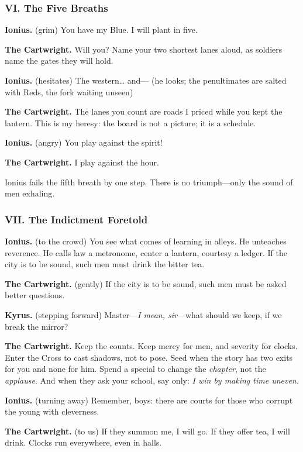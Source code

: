 \documentclass[11pt]{article}
\begin{document}
\medskip
\subsubsection*{VI. The Five Breaths}
\noindent\textbf{Ionius.} (grim) You have my Blue. I will plant in five.

\noindent\textbf{The Cartwright.} Will you? Name your two shortest lanes aloud, as soldiers name the gates they will hold.

\noindent\textbf{Ionius.} (hesitates) The western… and— (he looks; the penultimates are salted with Reds, the fork waiting unseen)

\noindent\textbf{The Cartwright.} The lanes you count are roads I priced while you kept the lantern. This is my heresy: the board is not a picture; it is a schedule.

\noindent\textbf{Ionius.} (angry) You play against the spirit!

\noindent\textbf{The Cartwright.} I play against the hour.

Ionius fails the fifth breath by one step. There is no triumph—only the sound of men exhaling.

\medskip
\subsubsection*{VII. The Indictment Foretold}
\noindent\textbf{Ionius.} (to the crowd) You see what comes of learning in alleys. He unteaches reverence. He calls law a metronome, center a lantern, courtesy a ledger. If the city is to be sound, such men must drink the bitter tea.

\noindent\textbf{The Cartwright.} (gently) If the city is to be sound, such men must be asked better questions.

\noindent\textbf{Kyrus.} (stepping forward) Master—\emph{I mean, sir}—what should we keep, if we break the mirror?

\noindent\textbf{The Cartwright.} Keep the counts. Keep mercy for men, and severity for clocks. Enter the Cross to cast shadows, not to pose. Seed when the story has two exits for you and none for him. Spend a special to change the \emph{chapter}, not the \emph{applause}. And when they ask your school, say only: \emph{I win by making time uneven.}

\noindent\textbf{Ionius.} (turning away) Remember, boys: there are courts for those who corrupt the young with cleverness.

\noindent\textbf{The Cartwright.} (to us) If they summon me, I will go. If they offer tea, I will drink. Clocks run everywhere, even in halls.
\end{document}
